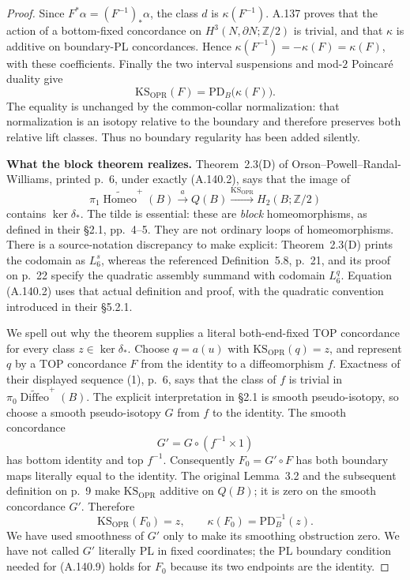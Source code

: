 \begin{proof}
Since $F^*\alpha=(F^{-1})_*\alpha$, the class $d$ is
$\kappa(F^{-1})$. A.137 proves that the action of a bottom-fixed
concordance on $H^3(N,\partial N;\mathbb Z/2)$ is trivial, and
that $\kappa$ is additive on boundary-PL concordances. Hence
$\kappa(F^{-1})=-\kappa(F)=\kappa(F)$, with these coefficients.
Finally the two interval suspensions and mod-$2$ Poincar\'e
duality give
\[
       \mathrm{KS}_{\mathrm{OPR}}(F)
                 =\mathrm{PD}_B\bigl(\kappa(F)\bigr).
                                                               \tag{A.140.9}
\]
The equality is unchanged by the common-collar normalization:
that normalization is an isotopy relative to the boundary and
therefore preserves both relative lift classes. Thus no boundary
regularity has been added silently.

\textbf{What the block theorem realizes.}
Theorem~2.3(D) of Orson--Powell--Randal-Williams, printed p.~6,
under exactly (A.140.2), says that the image of
\[
 \pi_1\widetilde{\operatorname{Homeo}}^+(B)
       \xrightarrow{a}Q(B)
       \xrightarrow{\mathrm{KS}_{\mathrm{OPR}}}
                       H_2(B;\mathbb Z/2)
\]
contains $\ker\delta_*$. The tilde is essential: these are
\emph{block} homeomorphisms, as defined in their \S2.1,
pp.~4--5. They are not ordinary loops of homeomorphisms.
There is a source-notation discrepancy to make explicit:
Theorem~2.3(D) prints the codomain as $L^s_6$, whereas the
referenced Definition~5.8, p.~21, and its proof on p.~22 specify
the quadratic assembly summand with codomain $L^q_6$.
Equation (A.140.2) uses that actual definition and proof, with
the quadratic convention introduced in their \S5.2.1.

We spell out why the theorem supplies a literal both-end-fixed
TOP concordance for every class $z\in\ker\delta_*$.
Choose $q=a(u)$ with $\mathrm{KS}_{\mathrm{OPR}}(q)=z$,
and represent $q$ by a TOP concordance $F$ from the identity to
a diffeomorphism $f$. Exactness of their displayed sequence (1),
p.~6, says that the class of $f$ is trivial in
$\pi_0\widetilde{\operatorname{Diffeo}}^+(B)$.
The explicit interpretation in \S2.1 is smooth pseudo-isotopy,
so choose a smooth pseudo-isotopy $G$ from $f$ to the identity.
The smooth concordance
\[
 G'=G\circ(f^{-1}\times1)
\]
has bottom identity and top $f^{-1}$. Consequently
$F_0=G'\circ F$ has both boundary maps literally equal to the
identity. The original Lemma~3.2 and the subsequent definition
on p.~9 make $\mathrm{KS}_{\mathrm{OPR}}$ additive on $Q(B)$;
it is zero on the smooth concordance $G'$. Therefore
\[
 \mathrm{KS}_{\mathrm{OPR}}(F_0)=z,
 \qquad \kappa(F_0)=\mathrm{PD}_B^{-1}(z).              \tag{A.140.10}
\]
We have used smoothness of $G'$ only to make its smoothing
obstruction zero. We have not called $G'$ literally PL in fixed
coordinates; the PL boundary condition needed for (A.140.9)
holds for $F_0$ because its two endpoints are the identity.


\end{proof}
